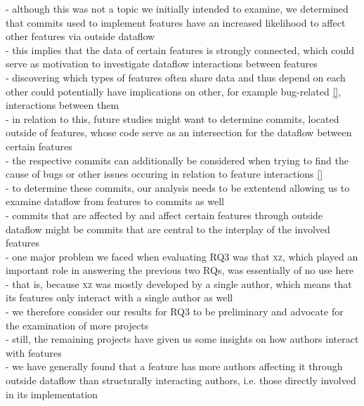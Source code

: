 - although this was not a topic we initially intended to examine, we determined that commits used to implement features have an increased likelihood to affect other features via outside dataflow \\
- this implies that the data of certain features is strongly connected, which could serve as motivation to investigate dataflow interactions between features \\
- discovering which types of features often share data and thus depend on each other could potentially have implications on other, for example bug-related \ref{}, interactions between them \\
- in relation to this, future studies might want to determine commits, located outside of features, whose code serve as an intersection for the dataflow between certain features \\
- the respective commits can additionally be considered when trying to find the cause of bugs or other issues occuring in relation to feature interactions \ref{} \\
- to determine these commits, our analysis needs to be extentend allowing us to examine dataflow from features to commits as well \\
- commits that are affected by and affect certain features through outside dataflow might be commits that are central to the interplay of the involved features \\

- one major problem we faced when evaluating RQ3 was that \textsc{xz}, which played an important role in answering the previous two RQs, was essentially of no use here \\
- that is, because \textsc{xz} was mostly developed by a single author, which means that its features only interact with a single author as well \\
- we therefore consider our results for RQ3 to be preliminary and advocate for the examination of more projects \\
- still, the remaining projects have given us some insights on how authors interact with features \\
- we have generally found that a feature has more authors affecting it through outside dataflow than structurally interacting authors, i.e. those directly involved in its implementation \\

